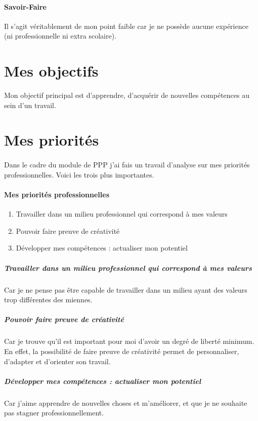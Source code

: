 \documentclass[a4paper,12pt, draft]{report}
\begin{document}
\paragraph{Savoir-Faire}
Il s'agit véritablement de mon point faible car je ne possède aucune expérience (ni professionnelle ni extra scolaire).

\section{Mes objectifs}
Mon objectif principal est d'apprendre, d'acquérir de nouvelles compétences au sein d'un travail.
\section{Mes priorités}
\paragraph{}
Dans le cadre du module de PPP j'ai fais un travail d'analyse sur mes priorités professionnelles. Voici les trois plus importantes.


\paragraph{Mes priorités professionnelles}
\begin{enumerate}
\item Travailler dans un milieu professionnel qui correspond à mes valeurs
\item Pouvoir faire preuve de créativité
\item Développer mes compétences : actualiser mon potentiel
\end{enumerate}


\paragraph{}
\subparagraph{Travailler dans un milieu professionnel qui correspond à mes valeurs}
Car je ne pense pas être capable de travailler dans un milieu ayant des valeurs trop différentes des miennes. 

\subparagraph{Pouvoir faire preuve de créativité}
Car je trouve qu'il est important pour moi d'avoir un degré de liberté minimum. En effet, la possibilité de faire preuve de créativité permet de personnaliser, d'adapter et d'orienter son travail.

\subparagraph{Développer mes compétences : actualiser mon potentiel}
Car j'aime apprendre de nouvelles choses et m'améliorer, et que je ne souhaite pas stagner professionnellement.
\end{document}
